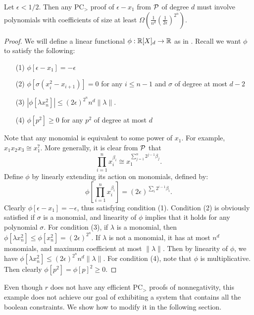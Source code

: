 \begin{lemma}\label{lem:nonbool-complex}
Let $\epsilon < 1/2$. Then any PC$_>$ proof of $\epsilon - x_1$ from $\mathcal P$ of degree $d$ must involve polynomials with coefficients of size at least $\Omega\left(\frac{1}{n^d}\left(\frac{1}{2\epsilon}\right)^{2^n}\right)$.
\end{lemma}
\begin{proof}
We will define a linear functional $\phi: \mathbb R[X]_d \rightarrow \mathbb R$ as in . Recall we want $\phi$ to satisfy the following:
\begin{enumerate}
\item[(1)] $\phi[\epsilon - x_1] = -\epsilon$
\item[(2)] $\phi[\sigma(x_i^2 - x_{i+1})] = 0$ for any $i \leq n-1$ and $\sigma$ of degree at most $d-2$
\item[(3)] $|\phi[\lambda x_n^2]| \leq (2\epsilon)^{2^{n}}n^d\|\lambda\|$.
\item[(4)] $\phi[p^2] \geq 0$ for any $p^2$ of degree at most $d$
\end{enumerate}

Note that any monomial is equivalent to some power of $x_1$. For example, $x_1x_2x_3 \cong x_1^7$.  More generally, it is clear from $\mathcal P$ that 
\[\prod_{i = 1}^n x_i^{\beta_i} \cong x_1^{\sum_{j = 1}^n 2^{j-1} \beta_j}.\] 
Define $\phi$ by linearly extending its action on monomials, defined by:
\[\phi\left[ \prod_{i = 1}^n x_i^{\beta_i}\right] = (2\epsilon)^{\sum_{i} 2^{i-1} \beta_i }. \]
Clearly $\phi[\epsilon - x_1] = -\epsilon$, thus satisfying condition (1). Condition (2) is obviously satisfied if $\sigma$ is a monomial, and linearity of $\phi$ implies that it holds for any polynomial $\sigma$. For condition (3), if $\lambda$ is a monomial, then $\phi[\lambda x_n^2] \leq \phi[x_n^2] = (2\epsilon)^{2^{n}}$. If $\lambda$ is not a monomial, it has at most $n^d$ monomials, and maximum coefficient at most $\|\lambda\|$. Then by linearity of $\phi$, we have $\phi[\lambda x_n^2] \leq (2\epsilon)^{2^n}n^d\|\lambda\|$. For condition (4), note that $\phi$ is multiplicative. Then clearly $\phi[p^2] = \phi[p]^2 \geq 0$. 
\end{proof}

Even though $r$ does not have any efficient PC$_>$ proofs of nonnegativity, this example does not achieve our goal of exhibiting a system that contains all the boolean constraints. We show how to modify it in the following section.

